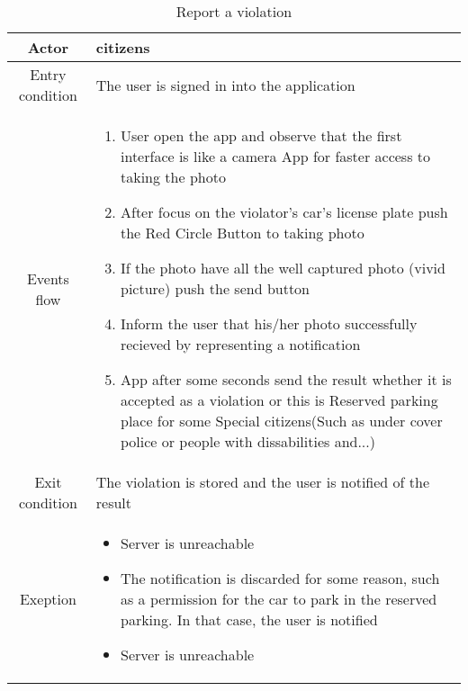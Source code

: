 \documentclass{article}
\begin{document}
		\begin{table} [H]
		\begin{center}
		\caption{Report a violation}
		\begin{tabular}{|c|p{8cm}|}
			\hline
			Actor&citizens\\
			\hline
			Entry condition&The user is signed in into the application\\
			\hline
			 Events flow& \begin{enumerate}
							\item User open the app and observe that the first interface is like a camera App for faster access to taking the photo			
							\item After focus on the violator's car's license plate push the Red Circle Button to taking photo
							\item If the photo have all the well captured photo (vivid picture) push the send button
							\item Inform the user that his/her photo successfully recieved by representing a notification
							\item App after some seconds send the result whether it is accepted as a violation or this is Reserved parking place for some Special citizens(Such as under cover police or people with dissabilities and...)
						\end{enumerate}\\
			\hline
			Exit condition& The violation is stored and the user is notified of the result\\
			\hline
			Exeption& \begin{itemize}
						\item Server is unreachable
						\item The notification is discarded for some reason, such as a permission for the car to park in the reserved parking. In that case, the user is notified
						\item Server is unreachable
					\end{itemize}\\
			\hline
		\end{tabular}
		\end{center}
		\end{table} 
		
\end{document}
